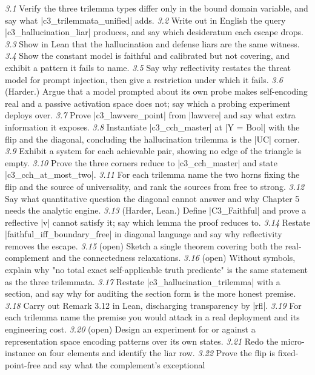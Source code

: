 \documentclass{memoir}
\begin{document}
\emph{3.1} Verify the three trilemma types differ only in the bound domain variable, and
say what \LeanVerb|c3_trilemmata_unified| adds.
\emph{3.2} Write out in English the query \LeanVerb|c3_hallucination_liar| produces, and say
which desideratum each escape drops.
\emph{3.3} Show in Lean that the hallucination and defense liars are the same witness.
\emph{3.4} Show the constant model is faithful and calibrated but not covering, and exhibit
a pattern it fails to name.
\emph{3.5} Say why reflectivity restates the threat model for prompt injection, then give a
restriction under which it fails.
\emph{3.6} (Harder.) Argue that a model prompted about its own probe makes self-encoding
real and a passive activation space does not; say which a probing experiment deploys
over.
\emph{3.7} Prove \LeanVerb|c3_lawvere_point| from \LeanVerb|lawvere| and say what extra
information it exposes.
\emph{3.8} Instantiate \LeanVerb|c3_cch_master| at \LeanVerb|Y = Bool| with the flip and the diagonal,
concluding the hallucination trilemma is the \LeanVerb|UC| corner.
\emph{3.9} Exhibit a system for each achievable pair, showing no edge of the triangle is
empty.
\emph{3.10} Prove the three corners reduce to \LeanVerb|c3_cch_master| and state
\LeanVerb|c3_cch_at_most_two|.
\emph{3.11} For each trilemma name the two horns fixing the flip and the source of
universality, and rank the sources from free to strong.
\emph{3.12} Say what quantitative question the diagonal cannot answer and why Chapter 5
needs the analytic engine.
\emph{3.13} (Harder, Lean.) Define \LeanVerb|C3_Faithful| and prove a reflective \LeanVerb|v| cannot satisfy
it; say which lemma the proof reduces to.
\emph{3.14} Restate \LeanVerb|faithful_iff_boundary_free| in diagonal language and say why
reflectivity removes the escape.
\emph{3.15} (open) Sketch a single theorem covering both the real-complement and the
connectedness relaxations.
\emph{3.16} (open) Without symbols, explain why "no total exact self-applicable truth
predicate" is the same statement as the three trilemmata.
\emph{3.17} Restate \LeanVerb|c3_hallucination_trilemma| with a section, and say why for
auditing the section form is the more honest premise.
\emph{3.18} Carry out Remark 3.12 in Lean, discharging transparency by \LeanVerb|rfl|.
\emph{3.19} For each trilemma name the premise you would attack in a real deployment and
its engineering cost.
\emph{3.20} (open) Design an experiment for or against a representation space encoding
patterns over its own states.
\emph{3.21} Redo the micro-instance on four elements and identify the liar row.
\emph{3.22} Prove the flip is fixed-point-free and say what the complement's exceptional
\end{document}
